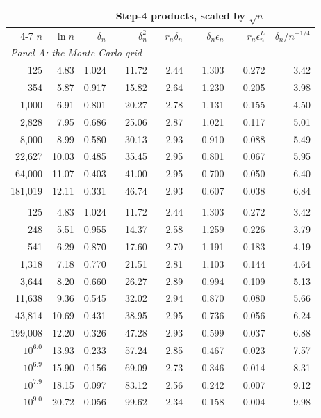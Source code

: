 \begin{tabular}{rrrrrrrr}
\toprule
 & & & \multicolumn{4}{c}{Step-4 products, scaled by $\sqrt n$} & \\
\cmidrule(lr){4-7}
$n$ & $\ln n$ & $\delta_n$ & $\delta_n^2$ & $r_n\delta_n$ & $\delta_n\epsilon_n$ & $r_n\epsilon^L_n$ & $\delta_n/n^{-1/4}$ \\
\midrule
\multicolumn{8}{l}{\textit{Panel A: the Monte Carlo grid}} \\
\midrule
125 & 4.83 & 1.024 & 11.72 & 2.44 & 1.303 & 0.272 & 3.42 \\
354 & 5.87 & 0.917 & 15.82 & 2.64 & 1.230 & 0.205 & 3.98 \\
1,000 & 6.91 & 0.801 & 20.27 & 2.78 & 1.131 & 0.155 & 4.50 \\
2,828 & 7.95 & 0.686 & 25.06 & 2.87 & 1.021 & 0.117 & 5.01 \\
8,000 & 8.99 & 0.580 & 30.13 & 2.93 & 0.910 & 0.088 & 5.49 \\
22,627 & 10.03 & 0.485 & 35.45 & 2.95 & 0.801 & 0.067 & 5.95 \\
64,000 & 11.07 & 0.403 & 41.00 & 2.95 & 0.700 & 0.050 & 6.40 \\
181,019 & 12.11 & 0.331 & 46.74 & 2.93 & 0.607 & 0.038 & 6.84 \\
\addlinespace
\multicolumn{8}{l}{\textit{Panel B: extended log-log grid, to the point where each product turns over}} \\
\midrule
125 & 4.83 & 1.024 & 11.72 & 2.44 & 1.303 & 0.272 & 3.42 \\
248 & 5.51 & 0.955 & 14.37 & 2.58 & 1.259 & 0.226 & 3.79 \\
541 & 6.29 & 0.870 & 17.60 & 2.70 & 1.191 & 0.183 & 4.19 \\
1,318 & 7.18 & 0.770 & 21.51 & 2.81 & 1.103 & 0.144 & 4.64 \\
3,644 & 8.20 & 0.660 & 26.27 & 2.89 & 0.994 & 0.109 & 5.13 \\
11,638 & 9.36 & 0.545 & 32.02 & 2.94 & 0.870 & 0.080 & 5.66 \\
43,814 & 10.69 & 0.431 & 38.95 & 2.95 & 0.736 & 0.056 & 6.24 \\
199,008 & 12.20 & 0.326 & 47.28 & 2.93 & 0.599 & 0.037 & 6.88 \\
$10^{6.0}$ & 13.93 & 0.233 & 57.24 & 2.85 & 0.467 & 0.023 & 7.57 \\
$10^{6.9}$ & 15.90 & 0.156 & 69.09 & 2.73 & 0.346 & 0.014 & 8.31 \\
$10^{7.9}$ & 18.15 & 0.097 & 83.12 & 2.56 & 0.242 & 0.007 & 9.12 \\
$10^{9.0}$ & 20.72 & 0.056 & 99.62 & 2.34 & 0.158 & 0.004 & 9.98 \\
\bottomrule
\end{tabular}
